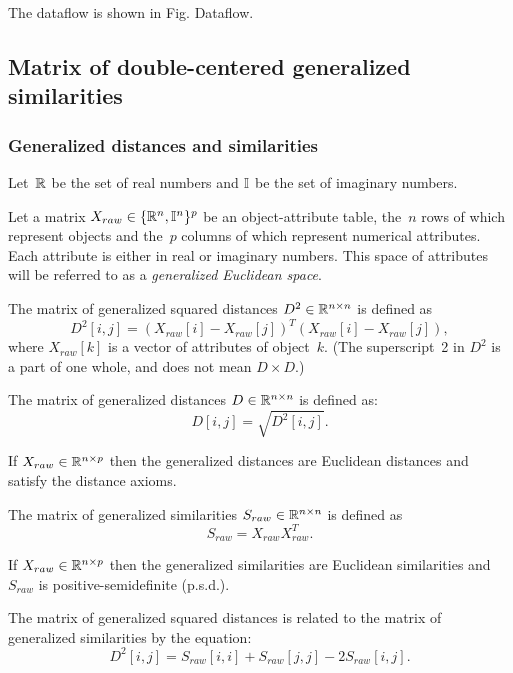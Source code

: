 \documentclass[10pt,a4paper]{article}
\begin{document}
The dataflow is shown in Fig. {Dataflow}.

\subsection {Matrix of double-centered generalized similarities}

\subsubsection {Generalized distances and similarities}

Let~$\mathbb R$ be the set of real numbers and $\mathbb I$ be the set of imaginary numbers.

Let a matrix $X_{raw} \in \{\mathbb R^n,\mathbb I^n\}^p$ be an object-attribute table, the~$n$ rows of which represent objects and the~$p$ columns of which represent numerical attributes.
Each attribute is either in real or imaginary numbers.
This space of attributes will be referred to as a {\em generalized Euclidean space}.

The matrix of generalized squared distances $D^2 \in \mathbb R^{n \times n}$ is defined as
$$ D^2[i,j] = (X_{raw}[i] - X_{raw}[j])^T (X_{raw}[i] - X_{raw}[j]),$$
where $X_{raw}[k]$ is a vector of attributes of object~$k$.
(The superscript~2 in $D^2$ is a part of one whole, and does not mean $D \times D$.)

The matrix of generalized distances $D \in \mathbb R^{n \times n}$ is defined as:
$$ D[i,j]  = \sqrt{D^2 [i,j]}. $$


If $X_{raw} \in \mathbb R^{n \times p}$ then the generalized distances are Euclidean distances and satisfy the distance axioms.

The matrix of generalized similarities $S_{raw} \in \mathbb R^{n \times n}$ is defined as
$$ S_{raw} = X_{raw} X_{raw}^T.$$

If $X_{raw} \in \mathbb R^{n \times p}$ then the generalized similarities are Euclidean similarities and $S_{raw}$ is positive-semidefinite (p.s.d.).


The matrix of generalized squared distances is related to the matrix of generalized similarities by the equation:
$$ D^2[i,j] = S_{raw}[i,i] + S_{raw}[j,j] - 2 S_{raw}[i,j].$$
\end{document}

